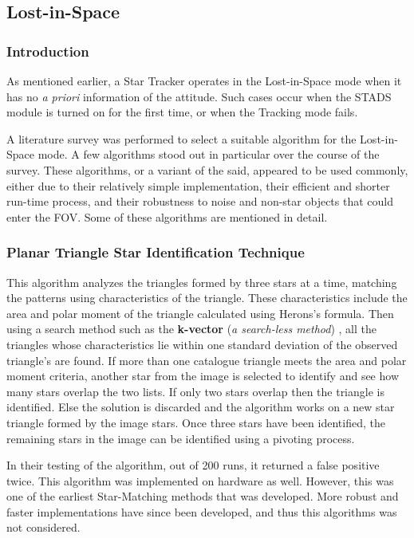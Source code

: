 \documentclass[../../main.tex]{subfiles}
\begin{document}
\subsection{Lost-in-Space}
\subsubsection{Introduction}

As mentioned earlier, a Star Tracker operates in the Lost-in-Space mode when it has no \textit{a priori} information of the attitude. Such cases occur when the STADS module is turned on for the first time, or when the Tracking mode fails.

A literature survey was performed to select a suitable algorithm for the Lost-in-Space mode. A few algorithms stood out in particular over the course of the survey. These algorithms, or a variant of the said, appeared to be used commonly, either due to their relatively simple implementation, their efficient and shorter run-time process, and their robustness to noise and non-star objects that could enter the FOV.
Some of these algorithms are mentioned in detail.

\subsubsection{Planar Triangle Star Identification Technique}

This algorithm \cite{mcbryde2012star} analyzes the triangles formed by three stars at a time, matching the patterns using characteristics of the triangle. These characteristics include the area and polar moment of the triangle calculated using Herons’s formula. 
Then using a search method such as the \textbf{k-vector} (\textit{a search-less method}) \cite{mortari2014k}, all the triangles whose characteristics lie within one standard deviation of the observed triangle's are found. 
If more than one catalogue triangle meets the area and polar moment criteria, another star from the image is selected to identify and see how many stars overlap the two lists. If only two stars overlap then the triangle is identified. Else the solution is discarded and the algorithm works on a new star triangle formed by the image stars. 
Once three stars have been identified, the remaining stars in the image can be identified using a pivoting process. 

In their testing of the algorithm, out of 200 runs, it returned a false positive twice. This algorithm was implemented on hardware as well. 
However, this was one of the earliest Star-Matching methods that was developed. More robust and faster implementations have since been developed, and thus this algorithms was not considered.
\end{document}

